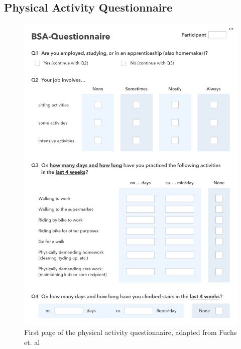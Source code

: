 \begin{appendices}
\clearpage

\section{Physical Activity Questionnaire}
\begin{figure}[htb]
	\centering
	\begin{minipage}[t]{0.82\linewidth}
		\centering
		\includegraphics[width=1\linewidth]{Pictures/App_BSA1}
		\caption{First page of the physical activity questionnaire, adapted from Fuchs et. al~\cite{Fuchs2015-bsa}}
		\label{fig:App_DemographicDataHTG}
	\end{minipage}
\end{figure}


\end{appendices}
